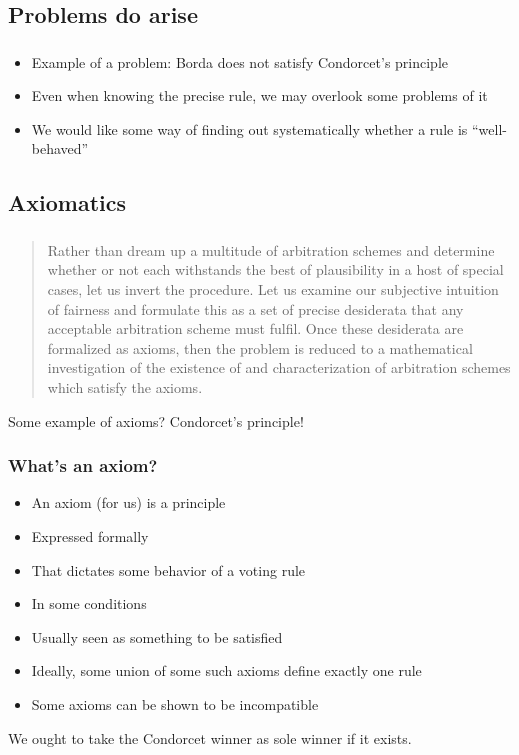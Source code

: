 \documentclass[french, english]{beamer}
\begin{document}
\subsection[Problem]{Problems do arise}
\begin{frame}
	\frametitle{\subsecname}
	\begin{itemize}
		\item Example of a problem: Borda does not satisfy Condorcet’s principle
		\item Even when knowing the precise rule, we may overlook some problems of it
		\item We would like some way of finding out systematically whether a rule is “well-behaved”
	\end{itemize}
\end{frame}

\subsection{Axiomatics}
\begin{frame}
	\frametitle{\subsecname}
	\begin{quote}
		Rather than dream up a multitude of arbitration schemes and determine whether or not each withstands the best of plausibility in a host of special cases, let us invert the procedure. Let us examine our subjective intuition of fairness and formulate this as a set of precise desiderata that any acceptable arbitration scheme must fulfil. Once these desiderata are formalized as axioms, then the problem is reduced to a mathematical investigation of the existence of and characterization of arbitration schemes which satisfy the axioms.
	\end{quote}
	\citet[p. 121]{luce_games_1957}\par
	Some example of axioms? \pause Condorcet’s principle!
\end{frame}

\begin{frame}
	\frametitle{What’s an axiom?}
	\begin{itemize}
		\item An axiom (for us) is a principle
		\item Expressed formally
		\item That dictates some behavior of a voting rule
		\item In some conditions
		\item Usually seen as something to be satisfied
		\item Ideally, some union of some such axioms define exactly one rule
		\item Some axioms can be shown to be incompatible
	\end{itemize}
	\begin{example}
		We ought to take the Condorcet winner as sole winner if it exists.
	\end{example}
\end{frame}
\end{document}

